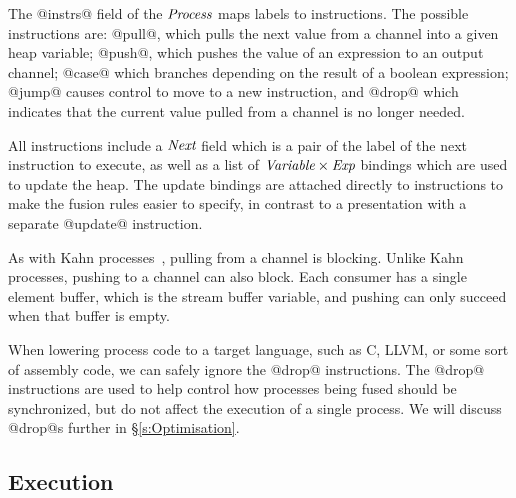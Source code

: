 The @instrs@ field of the $\textit{Process}$ maps labels to instructions. The possible instructions are: @pull@, which pulls the next value from a channel into a given heap variable; @push@, which pushes the value of an expression to an output channel; @case@ which branches depending on the result of a boolean expression; @jump@ causes control to move to a new instruction, and @drop@ which indicates that the current value pulled from a channel is no longer needed. 

All instructions include a $\textit{Next}$ field which is a pair of the label of the next instruction to execute, as well as a list of $\textit{Variable} \times \textit{Exp}$ bindings which are used to update the heap. The update bindings are attached directly to instructions to make the fusion rules easier to specify, in contrast to a presentation with a separate @update@ instruction. 

As with Kahn processes~\cite{kahn1976coroutines}, pulling from a channel is blocking. Unlike Kahn processes, pushing to a channel can also block. Each consumer has a single element buffer, which is the stream buffer variable, and pushing can only succeed when that buffer is empty.

When lowering process code to a target language, such as C, LLVM, or some sort of assembly code, we can safely ignore the @drop@ instructions. The @drop@ instructions are used to help control how processes being fused should be synchronized, but do not affect the execution of a single process. We will discuss @drop@s further in \S\ref{s:Optimisation}.


\subsection{Execution}
\label{s:Process:Eval}




